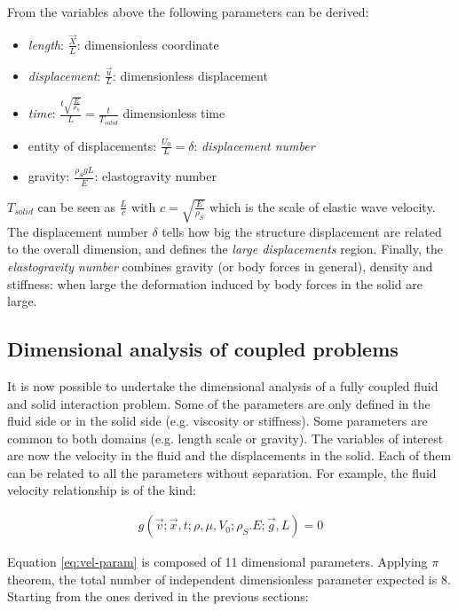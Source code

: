 From the variables above the following parameters can be derived:

\begin{itemize}
	\item \textit{length}: $\frac{\vec{X}}{L}$: dimensionless coordinate
	\item \textit{displacement}: $\frac{\vec{u}}{L}$: dimensionless displacement
	\item \textit{time}: $\frac{t \sqrt{\frac{E}{\rho_S}}}{L} = \frac{t}{T_{solid}}$ dimensionless time
	\item entity of displacements: $\frac{U_0}{L} = \delta$: \textit{displacement number}
	\item gravity: $\frac{\rho_S g L}{E}$: elastogravity number
\end{itemize}

$T_{solid}$ can be seen as $\frac{L}{c}$ with $c = \sqrt{\frac{E}{\rho_S}}$ which is the scale of elastic wave velocity. The displacement number $\delta$ tells how big the structure displacement are related to the overall dimension, and defines the \textit{large displacements} region.
Finally, the \textit{elastogravity number} combines gravity (or body forces in general), density and stiffness: when large the deformation induced by body forces in the solid are large. 

\subsection{Dimensional analysis of coupled problems}

It is now possible to undertake the dimensional analysis of a fully coupled fluid and solid interaction problem. Some of the parameters are only defined in the fluid side or in the solid side (e.g. viscosity or stiffness). Some parameters are common to both domains (e.g. length scale or gravity). The variables of interest are now the velocity in the fluid and the displacements in the solid. Each of them can be related to all the parameters without separation. For example, the fluid velocity relationship is of the kind:

\begin{eqnarray}
	 g(\vec{v}; \vec{x},t; \rho, \mu, V_0; \rho_S. E; \vec{g}, L) = 0
	 \label{eq:vel-param}
\end{eqnarray}


Equation \ref{eq:vel-param} is composed of 11 dimensional parameters. Applying $\pi$ theorem, the total number of independent dimensionless parameter expected is 8. Starting from the ones derived in the previous sections:

